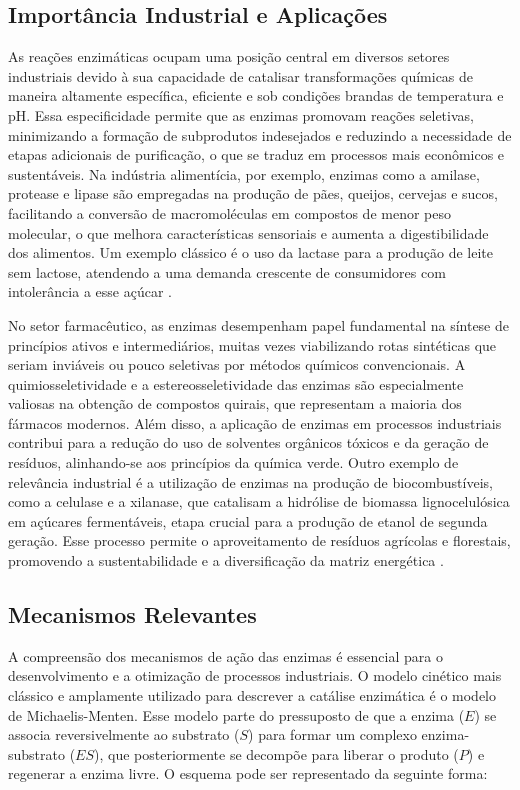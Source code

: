 \documentclass[12pt,oneside]{report}
\begin{document}
\subsection{Importância Industrial e Aplicações}

As reações enzimáticas ocupam uma posição central em diversos setores industriais devido à sua capacidade de catalisar transformações químicas de maneira altamente específica, eficiente e sob condições brandas de temperatura e pH. Essa especificidade permite que as enzimas promovam reações seletivas, minimizando a formação de subprodutos indesejados e reduzindo a necessidade de etapas adicionais de purificação, o que se traduz em processos mais econômicos e sustentáveis. Na indústria alimentícia, por exemplo, enzimas como a amilase, protease e lipase são empregadas na produção de pães, queijos, cervejas e sucos, facilitando a conversão de macromoléculas em compostos de menor peso molecular, o que melhora características sensoriais e aumenta a digestibilidade dos alimentos. Um exemplo clássico é o uso da lactase para a produção de leite sem lactose, atendendo a uma demanda crescente de consumidores com intolerância a esse açúcar \cite{buchholz2016enzymes}.

No setor farmacêutico, as enzimas desempenham papel fundamental na síntese de princípios ativos e intermediários, muitas vezes viabilizando rotas sintéticas que seriam inviáveis ou pouco seletivas por métodos químicos convencionais. A quimiosseletividade e a estereosseletividade das enzimas são especialmente valiosas na obtenção de compostos quirais, que representam a maioria dos fármacos modernos. Além disso, a aplicação de enzimas em processos industriais contribui para a redução do uso de solventes orgânicos tóxicos e da geração de resíduos, alinhando-se aos princípios da química verde. Outro exemplo de relevância industrial é a utilização de enzimas na produção de biocombustíveis, como a celulase e a xilanase, que catalisam a hidrólise de biomassa lignocelulósica em açúcares fermentáveis, etapa crucial para a produção de etanol de segunda geração. Esse processo permite o aproveitamento de resíduos agrícolas e florestais, promovendo a sustentabilidade e a diversificação da matriz energética \cite{patel2007biocatalysis}.

\subsection{Mecanismos Relevantes}

A compreensão dos mecanismos de ação das enzimas é essencial para o desenvolvimento e a otimização de processos industriais. O modelo cinético mais clássico e amplamente utilizado para descrever a catálise enzimática é o modelo de Michaelis-Menten. Esse modelo parte do pressuposto de que a enzima ($E$) se associa reversivelmente ao substrato ($S$) para formar um complexo enzima-substrato ($ES$), que posteriormente se decompõe para liberar o produto ($P$) e regenerar a enzima livre. O esquema pode ser representado da seguinte forma:
\end{document}
